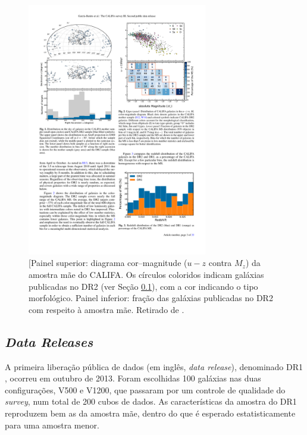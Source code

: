 \begin{figure}
	\includegraphics[width=0.7\textwidth]{figuras/CALIFACMD}
	\caption[Diagrama cor--magnitude da amostra mãe do CALIFA]
	{[Painel superior: diagrama cor--magnitude ($u-z$ contra $M_z$) da amostra mãe
	do CALIFA. Os círculos coloridos indicam galáxias publicadas no DR2 (ver Seção
	\ref{sec:ifs:dr}), com a cor indicando o tipo morfológico. Painel inferior:
	fração das galáxias publicadas no DR2 com respeito à amostra mãe. Retirado de
	\citet{GarciaBenito2015}.}
	\label{fig:CALIFACMD}
\end{figure}

\subsection{{\em Data Releases}}
\label{sec:ifs:dr}

A primeira liberação pública de dados (em inglês, {\em data release}),
denominado DR1 \citep{Husemann2013}, ocorreu em outubro de 2013. Foram
escolhidas 100 galáxias nas duas configurações, V500 e V1200, que passaram por
um controle de qualidade do {\em survey}, num total de 200 cubos de dados. As
características da amostra do DR1 reproduzem bem as da amostra mãe, dentro do
que é esperado estatisticamente para uma amostra menor.

